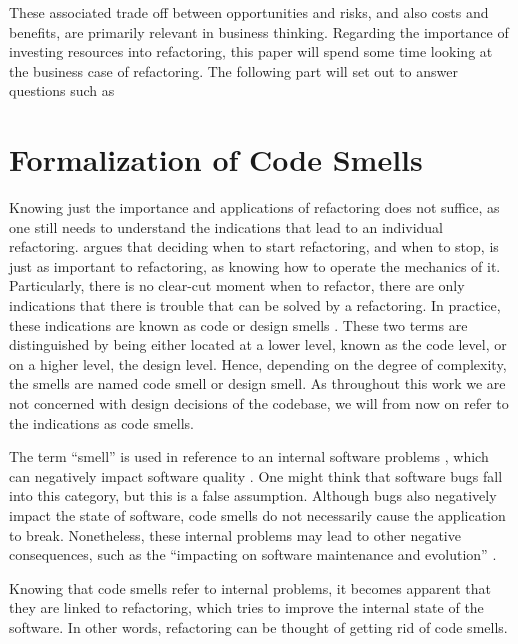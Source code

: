 These associated trade off between opportunities and risks, 
	and also costs and benefits, are 
	primarily relevant in business thinking. 
Regarding the importance of investing resources into refactoring, 
	this paper will spend some time 
	looking at the business case of refactoring.
The following part will set out to answer questions such as



\section{Formalization of Code Smells}

Knowing just the importance and applications of refactoring does not suffice, 
	as one still needs to understand the indications 
	that lead to an individual refactoring.
\textcite{fowler2018} argues that deciding when to start refactoring,
	and when to stop,
	is just as important to refactoring,
	as knowing how to operate the mechanics of it.
Particularly, there is no clear-cut moment when to refactor, 
	there are only indications 
	that there is trouble that can be solved by a refactoring.
In practice, 
	these indications are known as code or design smells 
	\cite[p.~2]{lacerda2020}.
These two terms are distinguished by being either located at a lower level,
	known as the code level, or on a higher level, 
	the design level. 
Hence, 
	depending on the degree of complexity, 
	the smells are named code smell or design smell.
As throughout this work we are not concerned 
	with design decisions of the codebase, 
	we will from now on refer to the indications as code smells.

The term “smell” is used in reference to an internal software problems
	\textcite[p.~2]{lacerda2020}, 
	which can negatively impact software quality 
	\cite[p.~1]{sonnleithner2021}. 
One might think that software bugs fall into this category, 
	but this is a false assumption.
Although bugs also negatively impact the state of software, 
	code smells do not necessarily cause the application to break.
Nonetheless, these internal problems may lead to other negative consequences,
	such as the “impacting on software maintenance and evolution”
	\cite[p.~2]{lacerda2020}.
 

Knowing that code smells refer to internal problems,
	it becomes apparent that they are linked to refactoring, 
	which tries to improve the internal state of the software.
In other words, 
	refactoring can be thought of getting rid of code smells. 

